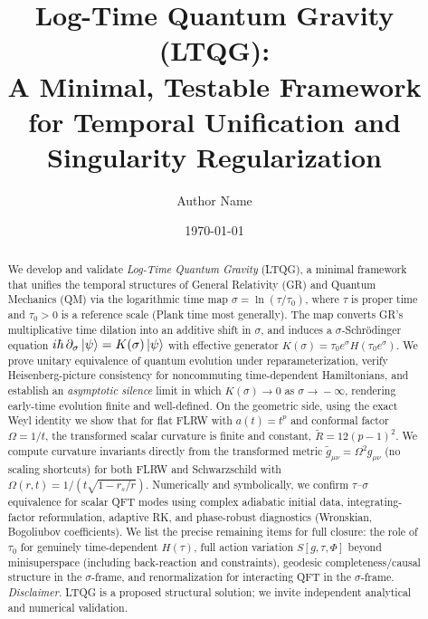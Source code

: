 \documentclass[11pt]{article}
\title{\vspace{-1em}%
Log-Time Quantum Gravity (LTQG): \\
A Minimal, Testable Framework for Temporal Unification and Singularity Regularization}
\author[1]{\normalsize Author Name}
\affil[1]{\small Affiliation, City, State, Country}
\date{\small \today}
\begin{document}
\maketitle

\begin{abstract}
We develop and validate \emph{Log-Time Quantum Gravity} (LTQG), a minimal framework that unifies the temporal structures of General Relativity (GR) and Quantum Mechanics (QM) via the logarithmic time map
\(\sigma=\ln(\tau/\tau_0)\), where \(\tau\) is proper time and \(\tau_0>0\) is a reference scale (Plank time most generally).
The map converts GR’s multiplicative time dilation into an additive shift in \(\sigma\), and induces a $\sigma$-Schr\"odinger equation
\( i\hbar\,\partial_\sigma\ket{\psi} = K(\sigma)\ket{\psi} \) with effective generator \(K(\sigma)=\tau_0 e^{\sigma} H(\tau_0 e^{\sigma})\).
We prove unitary equivalence of quantum evolution under reparameterization, verify Heisenberg-picture consistency for noncommuting time-dependent Hamiltonians, and establish an \emph{asymptotic silence} limit in which \(K(\sigma)\!\to\!0\) as \(\sigma\!\to\!-\infty\), rendering early-time evolution finite and well-defined.
On the geometric side, using the exact Weyl identity we show that for flat FLRW with \(a(t)=t^p\) and conformal factor \(\Omega=1/t\), the transformed scalar curvature is finite and constant, \(\tilde R=12(p-1)^2\).
We compute curvature invariants directly from the transformed metric \(\tilde g_{\mu\nu}=\Omega^2 g_{\mu\nu}\) (no scaling shortcuts) for both FLRW and Schwarzschild with \(\Omega(r,t)=1/(t\sqrt{1-r_s/r})\).
Numerically and symbolically, we confirm $\tau$–$\sigma$ equivalence for scalar QFT modes using complex adiabatic initial data, integrating-factor reformulation, adaptive RK, and phase-robust diagnostics (Wronskian, Bogoliubov coefficients).
We list the precise remaining items for full closure: the role of \(\tau_0\) for genuinely time-dependent \(H(\tau)\), full action variation \(S[g,\tau,\Phi]\) beyond minisuperspace (including back-reaction and constraints), geodesic completeness/causal structure in the $\sigma$-frame, and renormalization for interacting QFT in the $\sigma$-frame.
\emph{Disclaimer.} LTQG is a proposed structural solution; we invite independent analytical and numerical validation.
\end{abstract}
\end{document}
